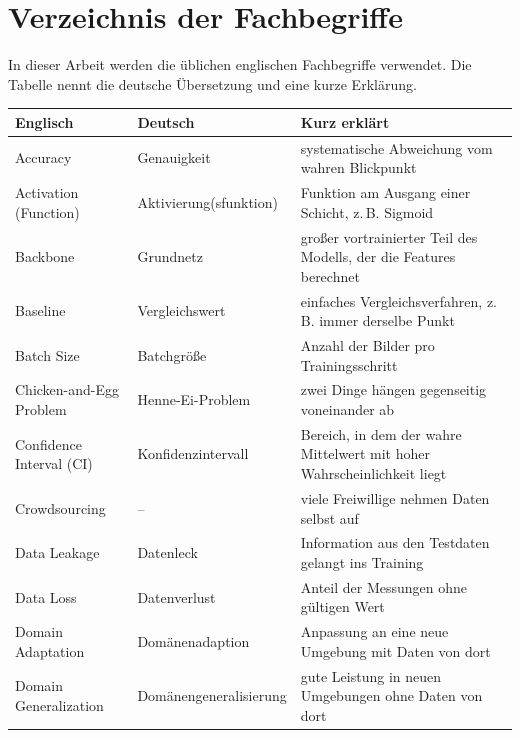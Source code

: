 \section{Verzeichnis der Fachbegriffe}
\label{sec:anhang_fachbegriffe}
In dieser Arbeit werden die üblichen englischen Fachbegriffe verwendet. Die
Tabelle nennt die deutsche Übersetzung und eine kurze Erklärung.

{\small\renewcommand{\arraystretch}{1.08}
\begin{longtable}{@{}L{4.1cm}L{3.8cm}>{\raggedright\arraybackslash}p{\dimexpr\textwidth-7.9cm-4\tabcolsep\relax}@{}}
  \toprule
  \textbf{Englisch} & \textbf{Deutsch} & \textbf{Kurz erklärt} \\
  \midrule
  \endhead
  \bottomrule
  \endfoot
  Accuracy & Genauigkeit & systematische Abweichung vom wahren Blickpunkt \\
  Activation (Function) & Aktivierung(sfunktion) & Funktion am Ausgang einer Schicht, z.\,B. Sigmoid \\
  Backbone & Grundnetz & großer vortrainierter Teil des Modells, der die Features berechnet \\
  Baseline & Vergleichswert & einfaches Vergleichsverfahren, z.\,B. immer derselbe Punkt \\
  Batch Size & Batchgröße & Anzahl der Bilder pro Trainingsschritt \\
  Chicken-and-Egg Problem & Henne-Ei-Problem & zwei Dinge hängen gegenseitig voneinander ab \\
  Confidence Interval (CI) & Konfidenzintervall & Bereich, in dem der wahre Mittelwert mit hoher Wahrscheinlichkeit liegt \\
  Crowdsourcing & -- & viele Freiwillige nehmen Daten selbst auf \\
  Data Leakage & Datenleck & Information aus den Testdaten gelangt ins Training \\
  Data Loss & Datenverlust & Anteil der Messungen ohne gültigen Wert \\
  Domain Adaptation & Domänenadaption & Anpassung an eine neue Umgebung mit Daten von dort \\
  Domain Generalization & Domänengeneralisierung & gute Leistung in neuen Umgebungen ohne Daten von dort \\

\end{longtable}}
